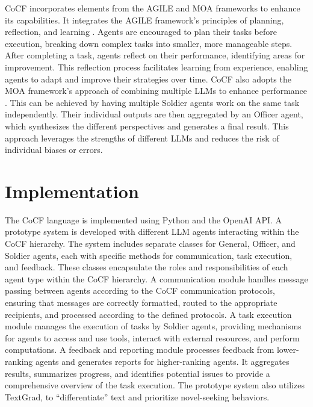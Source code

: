 CoCF incorporates elements from the AGILE and MOA frameworks to enhance its capabilities.
It integrates the AGILE framework's principles of planning, reflection, and
learning \cite{feng2024agilenovelreinforcementlearning}. Agents are encouraged to
plan their tasks before execution, breaking down complex tasks into smaller, more
manageable steps. After completing a task, agents reflect on their performance,
identifying areas for improvement. This reflection process facilitates learning from
experience, enabling agents to adapt and improve their strategies over time. CoCF
also adopts the MOA framework's approach of combining multiple LLMs to enhance performance
\cite{wang2024mixtureofagentsenhanceslargelanguage}. This can be achieved by
having multiple Soldier agents work on the same task independently. Their individual
outputs are then aggregated by an Officer agent, which synthesizes the different
perspectives and generates a final result. This approach leverages the strengths
of different LLMs and reduces the risk of individual biases or errors.

\section{Implementation}
\label{sec:Implementation}

The CoCF language is implemented using Python and the OpenAI API. A prototype system
is developed with different LLM agents interacting within the CoCF hierarchy.
The system includes separate classes for General, Officer, and Soldier agents, each
with specific methods for communication, task execution, and feedback. These
classes encapsulate the roles and responsibilities of each agent type within the
CoCF hierarchy. A communication module handles message passing between agents according
to the CoCF communication protocols, ensuring that messages are correctly
formatted, routed to the appropriate recipients, and processed according to the
defined protocols. A task execution module manages the execution of tasks by Soldier
agents, providing mechanisms for agents to access and use tools, interact with external
resources, and perform computations. A feedback and reporting module processes feedback
from lower-ranking agents and generates reports for higher-ranking agents. It
aggregates results, summarizes progress, and identifies potential issues to
provide a comprehensive overview of the task execution. The prototype system also
utilizes TextGrad, to ``differentiate'' text and prioritize novel-seeking
behaviors.

